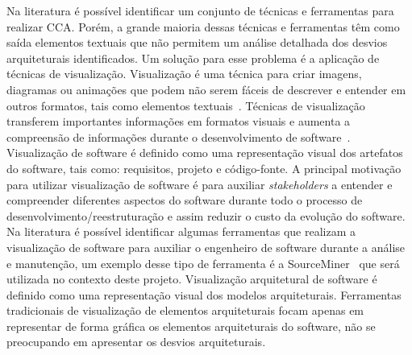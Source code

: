 \documentclass[12pt]{article}
\begin{document}
Na literatura é possível identificar um conjunto de técnicas e ferramentas para realizar CCA\cite{Maffort_2013, Knodel_2007, ArchJava_2202}. Porém, a grande maioria dessas técnicas e ferramentas têm como saída elementos textuais que não permitem um análise detalhada dos desvios arquiteturais identificados. Um solução para esse problema é a aplicação de técnicas de visualização. Visualização é uma técnica para criar imagens, diagramas ou animações que podem não serem fáceis de descrever e entender em outros formatos, tais como elementos textuais~\cite{spence2014information}. Técnicas de visualização transferem importantes informações em formatos visuais e aumenta a compreensão de informações durante o desenvolvimento de software~\cite{Diehl_2007}. Visualização de software é definido como uma representação visual dos artefatos do software, tais como: requisitos, projeto e código-fonte. A principal motivação para utilizar visualização de software é para auxiliar \textit{stakeholders} a entender e compreender diferentes aspectos do software durante todo o processo de desenvolvimento/reestruturação e assim reduzir o custo da evolução do software\cite{Diehl_2007, Gallagher_2008}. Na literatura é possível identificar algumas ferramentas que realizam a visualização de software para auxiliar o engenheiro de software durante a análise e manutenção, um exemplo desse tipo de  ferramenta é a SourceMiner~\cite{source_miner_glauco} que será utilizada no contexto deste projeto. Visualização arquitetural de software é definido como uma representação visual dos modelos arquiteturais. Ferramentas tradicionais de visualização de elementos arquiteturais focam apenas em representar de forma gráfica os elementos arquiteturais do software, não se preocupando em apresentar os desvios arquiteturais. 
\end{document}
